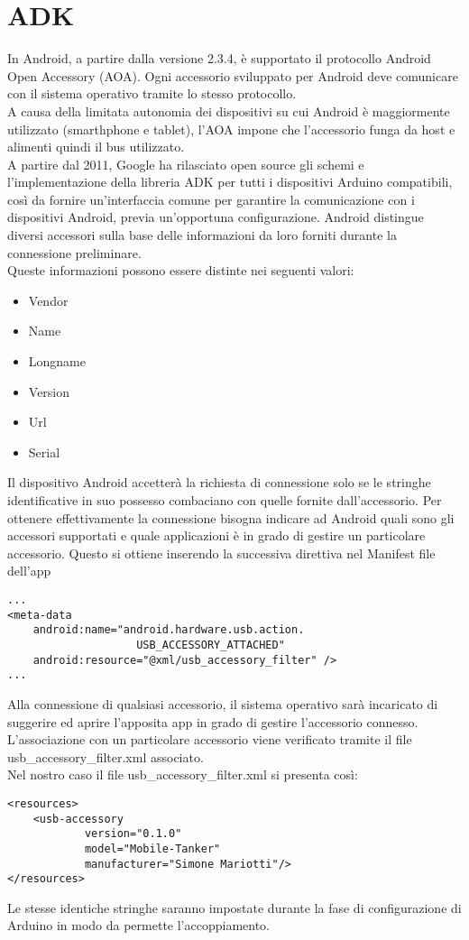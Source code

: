 \section {ADK}
In Android, a partire dalla versione 2.3.4, è supportato il protocollo Android Open 
Accessory (AOA). Ogni accessorio sviluppato per Android deve comunicare con il sistema operativo 
tramite lo stesso protocollo. 
\\A causa della limitata autonomia dei dispositivi su cui Android è maggiormente 
utilizzato (smarthphone e tablet), l'AOA impone che l'accessorio funga da host 
e alimenti quindi il bus utilizzato.\cite{aoa}
\\A partire dal 2011, Google ha rilasciato open source gli schemi e l'implementazione 
della libreria ADK per tutti i dispositivi Arduino compatibili, così da fornire 
un'interfaccia comune per garantire la comunicazione con i dispositivi Android, 
previa un'opportuna configurazione. Android distingue diversi accessori 
sulla base delle informazioni da loro forniti durante la connessione preliminare. 
\\Queste informazioni possono essere distinte nei seguenti valori:
\begin{itemize}
\item Vendor
\item Name
\item Longname
\item Version
\item Url
\item Serial
\end{itemize} 
Il dispositivo Android accetterà la richiesta di connessione solo se le stringhe 
identificative in suo possesso combaciano con quelle fornite 
dall'accessorio. Per ottenere effettivamente la connessione bisogna indicare ad 
Android quali sono gli accessori supportati e quale applicazioni è in grado di 
gestire un particolare accessorio. Questo si ottiene inserendo la successiva 
direttiva nel Manifest file dell'app

\lstset{language=XML}

\begin{lstlisting}[caption=Porzione del Manifest file dell'app]
...
<meta-data
    android:name="android.hardware.usb.action.
    				USB_ACCESSORY_ATTACHED"
    android:resource="@xml/usb_accessory_filter" />
...
\end{lstlisting}
Alla connessione di qualsiasi accessorio, il sistema operativo sarà incaricato 
di suggerire ed aprire l'apposita app in grado di gestire l'accessorio connesso. 
L'associazione con un particolare accessorio viene verificato tramite il file 
usb\_accessory\_filter.xml associato.
\\Nel nostro caso il file usb\_accessory\_filter.xml si presenta così:
\begin{lstlisting}[caption=usb\_accessory\_filter.xml]
<resources>
    <usb-accessory
            version="0.1.0"
            model="Mobile-Tanker"
            manufacturer="Simone Mariotti"/>
</resources>
\end{lstlisting}
Le stesse identiche stringhe saranno impostate durante la fase di configurazione 
di Arduino in modo da permette l'accoppiamento.
